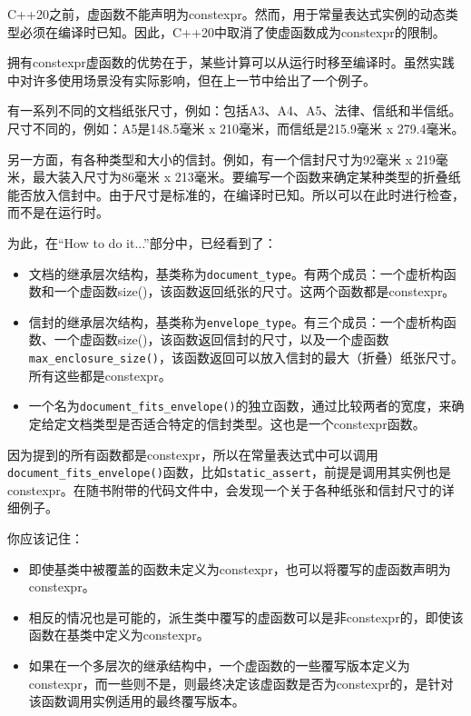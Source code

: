 
C++20之前，虚函数不能声明为constexpr。然而，用于常量表达式实例的动态类型必须在编译时已知。因此，C++20中取消了使虚函数成为constexpr的限制。

拥有constexpr虚函数的优势在于，某些计算可以从运行时移至编译时。虽然实践中对许多使用场景没有实际影响，但在上一节中给出了一个例子。

有一系列不同的文档纸张尺寸，例如：包括A3、A4、A5、法律、信纸和半信纸。尺寸不同的，例如：A5是148.5毫米 x 210毫米，而信纸是215.9毫米 x 279.4毫米。

另一方面，有各种类型和大小的信封。例如，有一个信封尺寸为92毫米 x 219毫米，最大装入尺寸为86毫米 x 213毫米。要编写一个函数来确定某种类型的折叠纸能否放入信封中。由于尺寸是标准的，在编译时已知。所以可以在此时进行检查，而不是在运行时。

为此，在“How to do it...”部分中，已经看到了：

\begin{itemize}
\item
文档的继承层次结构，基类称为\verb|document_type|。有两个成员：一个虚析构函数和一个虚函数size()，该函数返回纸张的尺寸。这两个函数都是constexpr。

\item
信封的继承层次结构，基类称为\verb|envelope_type|。有三个成员：一个虚析构函数、一个虚函数size()，该函数返回信封的尺寸，以及一个虚函数\verb|max_enclosure_size()|，该函数返回可以放入信封的最大（折叠）纸张尺寸。所有这些都是constexpr。

\item
一个名为\verb|document_fits_envelope()|的独立函数，通过比较两者的宽度，来确定给定文档类型是否适合特定的信封类型。这也是一个constexpr函数。
\end{itemize}

因为提到的所有函数都是constexpr，所以在常量表达式中可以调用\verb|document_fits_envelope()|函数，比如\verb|static_assert|，前提是调用其实例也是constexpr。在随书附带的代码文件中，会发现一个关于各种纸张和信封尺寸的详细例子。

你应该记住：

\begin{itemize}
\item
即使基类中被覆盖的函数未定义为constexpr，也可以将覆写的虚函数声明为constexpr。

\item
相反的情况也是可能的，派生类中覆写的虚函数可以是非constexpr的，即使该函数在基类中定义为constexpr。

\item
如果在一个多层次的继承结构中，一个虚函数的一些覆写版本定义为constexpr，而一些则不是，则最终决定该虚函数是否为constexpr的，是针对该函数调用实例适用的最终覆写版本。
\end{itemize}



